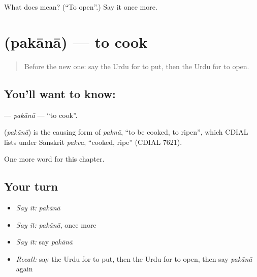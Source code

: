 \begin{tcolorbox}[breakable,colback=teal!4,colframe=teal!35!black,title={Before you move on}]
What does  mean? (\textquotedblleft{}To open\textquotedblright{}.) Say it once more.
\end{tcolorbox}
\section[\texorpdfstring{\ur{پکانا} (pakānā)}{پکانا (pakānā)}]{ (pakānā) — to cook}

\label{lesson:UR-C49-pakana}



\begin{quote}
Before the new one: say the Urdu for to put, then the Urdu for to open.
\end{quote}

\subsection*{You'll want to know: }
\textbf{} — \emph{pakānā} — \textquotedblleft{}to cook\textquotedblright{}.

\begin{cousinweb}
\textbf{} (\emph{pakānā}) is the causing form of \emph{paknā}, \textquotedblleft{}to be cooked, to ripen\textquotedblright{}, which CDIAL lists under Sanskrit \emph{pakva}, \textquotedblleft{}cooked, ripe\textquotedblright{} (CDIAL 7621).
\end{cousinweb}

\begin{grammarlens}[title={What you've built}]
One more word for this chapter.
\end{grammarlens}

\subsection*{Your turn}
\begin{itemize}
\raggedright
  \item \emph{Say it:} \emph{pakānā}
  \item \emph{Say it:} \emph{pakānā}, once more
  \item \emph{Say it:} say \emph{pakānā}
  \item \emph{Recall:} say the Urdu for to put, then the Urdu for to open, then say \emph{pakānā} again
\end{itemize}

